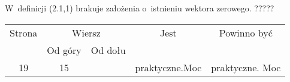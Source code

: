 \documentclass[a4paper,11pt]{article}
\begin{document}

\vspace{0em}


\noindent
{} W~definicji (2.1,1) brakuje założenia o~istnieniu wektora zerowego. ?????

\vspace{\spaceFour}





\newpage



\begin{center}

  \begin{tabular}{|c|c|c|c|c|}
    \hline
    Strona & \multicolumn{2}{c|}{Wiersz} & Jest
                              & Powinno być \\ \cline{2-3}
    & Od góry & Od dołu & & \\
    \hline
    19  & 15 & & praktyczne.Moc & praktyczne. Moc \\
    \hline
  \end{tabular}

\end{center}

\vspace{\spaceTwo}
















{}






\end{document}
